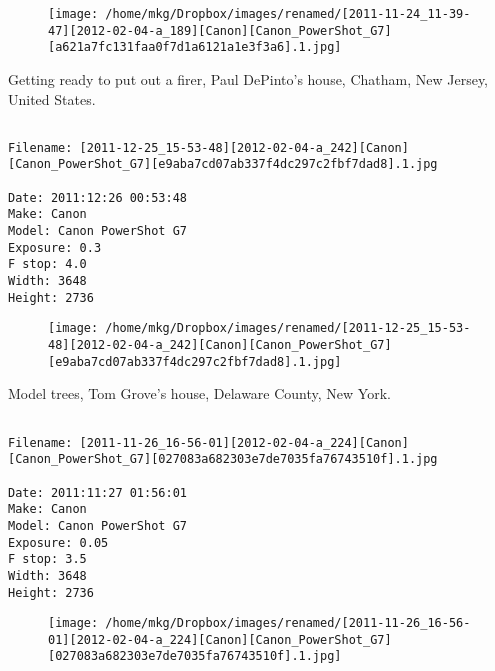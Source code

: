 \begin{figure}
\texttt{[image: /home/mkg/Dropbox/images/renamed/[2011-11-24\_11-39-47][2012-02-04-a\_189][Canon][Canon\_PowerShot\_G7][a621a7fc131faa0f7d1a6121a1e3f3a6].1.jpg]}
\end{figure}
    
\clearpage
\onecolumn
\noindent Getting ready to put out a firer, Paul DePinto's house, Chatham, New Jersey, United States.
\noindent
\begin{lstlisting}

Filename: [2011-12-25_15-53-48][2012-02-04-a_242][Canon][Canon_PowerShot_G7][e9aba7cd07ab337f4dc297c2fbf7dad8].1.jpg

Date: 2011:12:26 00:53:48
Make: Canon
Model: Canon PowerShot G7
Exposure: 0.3
F stop: 4.0
Width: 3648
Height: 2736
\end{lstlisting}
\clearpage

\begin{figure}
\texttt{[image: /home/mkg/Dropbox/images/renamed/[2011-12-25\_15-53-48][2012-02-04-a\_242][Canon][Canon\_PowerShot\_G7][e9aba7cd07ab337f4dc297c2fbf7dad8].1.jpg]}
\end{figure}
    
\clearpage
\onecolumn
\noindent Model trees, Tom Grove's house, Delaware County, New York.
\noindent
\begin{lstlisting}

Filename: [2011-11-26_16-56-01][2012-02-04-a_224][Canon][Canon_PowerShot_G7][027083a682303e7de7035fa76743510f].1.jpg

Date: 2011:11:27 01:56:01
Make: Canon
Model: Canon PowerShot G7
Exposure: 0.05
F stop: 3.5
Width: 3648
Height: 2736
\end{lstlisting}
\clearpage

\begin{figure}
\texttt{[image: /home/mkg/Dropbox/images/renamed/[2011-11-26\_16-56-01][2012-02-04-a\_224][Canon][Canon\_PowerShot\_G7][027083a682303e7de7035fa76743510f].1.jpg]}
\end{figure}
    
